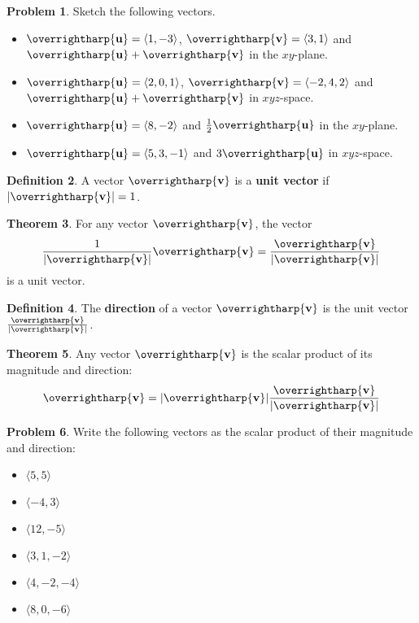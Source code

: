 \documentclass[letterpaper, twoside, 12pt]{book}
\newcommand{\<}{\langle}
\renewcommand{\>}{\rangle}
\theoremstyle{definition}
\newtheorem{theorem}{Theorem}
\theoremstyle{definition}
\newtheorem{definition}[theorem]{Definition}
\newtheorem{problem}[theorem]{Problem}
\newcommand{\harpvec}[1]{\overrightharp{\ensuremath{\mathbf{#1}}}}
\begin{document}
\newpage

\begin{problem}
  Sketch the following vectors.
  \begin{itemize}
    \item $\harpvec{u}=\<1,-3\>$, $\harpvec{v}=\<3,1\>$
          and $\harpvec{u}+\harpvec{v}$ in the $xy$-plane.
    \item $\harpvec{u}=\<2,0,1\>$, $\harpvec{v}=\<-2,4,2\>$
          and $\harpvec{u}+\harpvec{v}$ in $xyz$-space.
    \item $\harpvec{u}=\<8,-2\>$ and $\frac{1}{2}\harpvec{u}$ in the $xy$-plane.
    \item $\harpvec{u}=\<5,3,-1\>$ and $3\harpvec{u}$ in $xyz$-space.
  \end{itemize}
\end{problem}

\vfill

\begin{definition}
  A vector $\harpvec{v}$ is a \textbf{unit vector} if $|\harpvec v|=1$.
\end{definition}

\begin{theorem}
  For any vector $\harpvec{v}$, the vector
  \[
    \frac{1}{|\harpvec v|}\harpvec{v} = \frac{\harpvec v}{|\harpvec v|}
  \]
  is a unit vector.
\end{theorem}

\begin{definition}
  The \textbf{direction} of a vector $\harpvec v$ is the unit vector
  $\frac{\harpvec v}{|\harpvec v|}$.
\end{definition}

\begin{theorem}
  Any vector $\harpvec v$ is the scalar product of its magnitude and direction:
  \[
    \harpvec v = |\harpvec v|\frac{\harpvec v}{|\harpvec v|}
  \]
\end{theorem}

\newpage

\begin{problem}
  Write the following vectors as the scalar product of their magnitude and
  direction:
  \begin{itemize}
    \item $\<5,5\>$
    \item $\<-4,3\>$
    \item $\<12,-5\>$
    \item $\<3,1,-2\>$
    \item $\<4,-2,-4\>$
    \item $\<8,0,-6\>$
  \end{itemize}
\end{problem}
\end{document}
